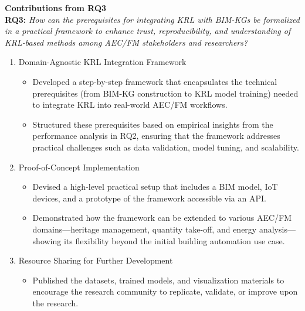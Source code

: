 \noindent \textbf{Contributions from RQ3}\\
\noindent \textbf{RQ3:} \textit{How can the prerequisites for integrating KRL with BIM-KGs be formalized in a practical framework to enhance trust, reproducibility, and understanding of KRL-based methods among AEC/FM stakeholders and researchers?}

\begin{enumerate}
\item 
Domain-Agnostic KRL Integration Framework
    \begin{itemize}
    \item 
    Developed a step-by-step framework that encapsulates the technical prerequisites (from \ac{BIM-KG} construction to \ac{KRL} model training) needed to integrate \ac{KRL} into real-world AEC/FM workflows.

    \item 
    Structured these prerequisites based on empirical insights from the performance analysis in RQ2, ensuring that the framework addresses practical challenges such as data validation, model tuning, and scalability.
    \end{itemize}

\item 
Proof-of-Concept Implementation
    \begin{itemize}
    \item 
    Devised a high-level practical setup that includes a \ac{BIM} model, \ac{IoT} devices, and a prototype of the framework accessible via an \ac{API}.
    \item 
    Demonstrated how the framework can be extended to various \ac{AEC/FM} domains—heritage management, quantity take-off, and energy analysis—showing its flexibility beyond the initial building automation use case.
    \end{itemize} 
\item 
Resource Sharing for Further Development
    \begin{itemize}
    \item 
    Published the datasets, trained models, and visualization materials to encourage the research community to replicate, validate, or improve upon the research.
    \end{itemize} 
\end{enumerate}

